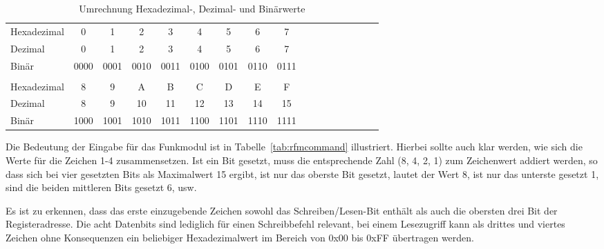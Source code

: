 \documentclass[pdftex, parskip, numbers=noenddot, toc=listof]{scrbook}
\begin{document}
	\begin{table}
		\begin{center}
			\begin{tabularx}{.8\textwidth}{X*{16}c}
				\hline\hline
				Hexadezimal & 0    & 1    & 2    & 3    & 4    & 5    & 6    & 7    \\
				Dezimal     & 0    & 1    & 2    & 3    & 4    & 5    & 6    & 7    \\
				Binär      & 0000 & 0001 & 0010 & 0011 & 0100 & 0101 & 0110 & 0111 \\
				\\
				Hexadezimal & 8    & 9    & A    & B    & C    & D    & E    & F    \\
				Dezimal     & 8    & 9    & 10   & 11   & 12   & 13   & 14   & 15   \\
				Binär      & 1000 & 1001 & 1010 & 1011 & 1100 & 1101 & 1110 & 1111 \\ \hline\hline
			\end{tabularx}
		\end{center}
		\caption{Umrechnung Hexadezimal-, Dezimal- und Binärwerte}
		\label{tab:zahlensysteme}
	\end{table}

	Die Bedeutung der Eingabe für das Funkmodul ist in Tabelle~\ref{tab:rfmcommand} illustriert. Hierbei sollte auch klar werden, wie sich die Werte für die Zeichen 1-4 zusammensetzen. Ist ein Bit gesetzt, muss die entsprechende Zahl (8, 4, 2, 1) zum Zeichenwert addiert werden, so dass sich bei vier gesetzten Bits als Maximalwert 15 ergibt, ist nur das oberste Bit gesetzt, lautet der Wert 8, ist nur das unterste gesetzt 1, sind die beiden mittleren Bits gesetzt 6, usw.

	Es ist zu erkennen, dass das erste einzugebende Zeichen sowohl das Schreiben/Lesen-Bit enthält als auch die obersten drei Bit der Registeradresse. Die acht Datenbits sind lediglich für einen Schreibbefehl relevant, bei einem Lesezugriff kann als drittes und viertes Zeichen ohne Konsequenzen ein beliebiger Hexadezimalwert im Bereich von 0x00 bis 0xFF übertragen werden.
\end{document}
